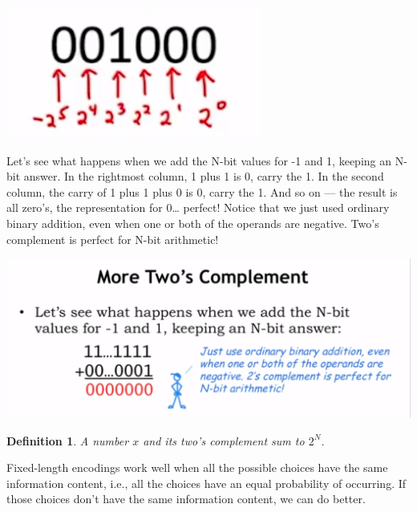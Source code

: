 \documentclass[a4paper,twoside]{article}
\newtheorem{definition}[theorem]{Definition}
\numberwithin{equation}{section}
\begin{document}
\begin{center}
    \includegraphics[scale=0.2]{assets/twos.png}
\end{center}
Let's see what happens when we add the N-bit values for -1 and 1, keeping an N-bit answer. In the
rightmost column, 1 plus 1 is 0, carry the 1. In the second column, the carry of 1 plus 1 plus 0 is 0,
carry the 1. And so on — the result is all zero's, the representation for 0… perfect! Notice that we
 just used ordinary binary addition, even when one or both of the operands are negative.
 Two's complement is perfect for N-bit arithmetic!

\begin{center}
    \includegraphics[scale=0.2]{assets/oneplusone.png}
\end{center}

\begin{definition}
    A number $x$ and its two's complement sum to $2^N$.
\end{definition}
Fixed-length encodings work well when all the possible choices have the same information content,
 i.e., all the choices have an equal probability of occurring. If those choices don't have the
 same information content, we can do better.
\end{document}
